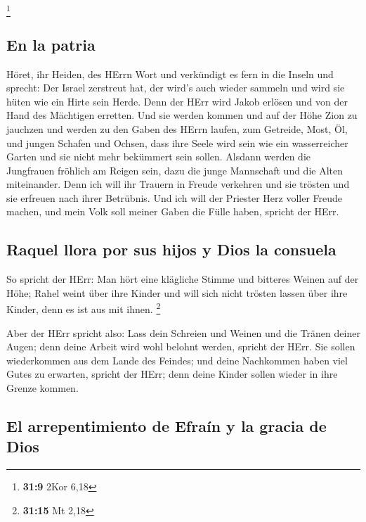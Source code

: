 \footnote{\textbf{31:9} 2Kor 6,18}

\hypertarget{en-la-patria}{%
\subsection{En la patria}\label{en-la-patria}}

 Höret, ihr Heiden, des HErrn Wort und verkündigt es fern
in die Inseln und sprecht: Der Israel zerstreut hat, der wird's auch
wieder sammeln und wird sie hüten wie ein Hirte sein Herde.
 Denn der HErr wird Jakob erlösen und von der Hand des
Mächtigen erretten.  Und sie werden kommen und auf der
Höhe Zion zu jauchzen und werden zu den Gaben des HErrn laufen, zum
Getreide, Most, Öl, und jungen Schafen und Ochsen, dass ihre Seele wird
sein wie ein wasserreicher Garten und sie nicht mehr bekümmert sein
sollen.  Alsdann werden die Jungfrauen fröhlich am Reigen
sein, dazu die junge Mannschaft und die Alten miteinander. Denn ich will
ihr Trauern in Freude verkehren und sie trösten und sie erfreuen nach
ihrer Betrübnis.  Und ich will der Priester Herz voller
Freude machen, und mein Volk soll meiner Gaben die Fülle haben, spricht
der HErr.

\hypertarget{raquel-llora-por-sus-hijos-y-dios-la-consuela}{%
\subsection{Raquel llora por sus hijos y Dios la
consuela}\label{raquel-llora-por-sus-hijos-y-dios-la-consuela}}

 So spricht der HErr: Man hört eine klägliche Stimme und
bitteres Weinen auf der Höhe; Rahel weint über ihre Kinder und will sich
nicht trösten lassen über ihre Kinder, denn es ist aus mit ihnen.
\footnote{\textbf{31:15} Mt 2,18}

 Aber der HErr spricht also: Lass dein Schreien und
Weinen und die Tränen deiner Augen; denn deine Arbeit wird wohl belohnt
werden, spricht der HErr. Sie sollen wiederkommen aus dem Lande des
Feindes;  und deine Nachkommen haben viel Gutes zu
erwarten, spricht der HErr; denn deine Kinder sollen wieder in ihre
Grenze kommen.

\hypertarget{el-arrepentimiento-de-efrauxedn-y-la-gracia-de-dios}{%
\subsection{El arrepentimiento de Efraín y la gracia de
Dios}\label{el-arrepentimiento-de-efrauxedn-y-la-gracia-de-dios}}

